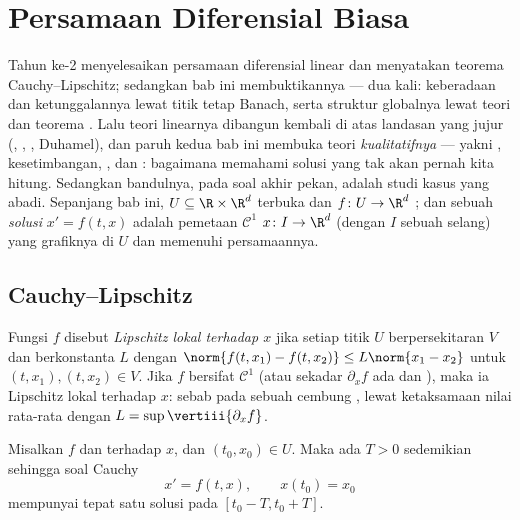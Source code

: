 \chapter{Persamaan Diferensial Biasa}\label{ch:b3:ode}

Tahun ke-2 menyelesaikan persamaan diferensial linear dan menyatakan
teorema Cauchy--Lipschitz; sedangkan bab ini membuktikannya --- dua kali:
keberadaan dan ketunggalannya lewat titik tetap Banach, serta
struktur globalnya lewat teori  dan
teorema . Lalu teori linearnya dibangun
kembali di atas landasan yang jujur (, , , Duhamel), dan paruh kedua bab ini membuka
teori \emph{kualitatifnya} --- yakni , kesetimbangan,
, dan : bagaimana
memahami solusi yang tak akan pernah kita hitung. Sedangkan bandulnya, pada
soal akhir pekan, adalah studi kasus yang abadi. Sepanjang bab ini,
$U \subseteq \R\times\R^d$ terbuka dan $f \colon U \to \R^d$
; dan sebuah \emph{solusi} $x' = f(t, x)$ adalah
pemetaan $\mathcal C^1$ $x \colon I \to \R^d$ (dengan $I$ sebuah selang)
yang grafiknya di $U$ dan memenuhi persamaannya.

\section{Cauchy--Lipschitz}

\begin{definition}\label{def:b3:ode:lipschitz}
Fungsi $f$ disebut \emph{Lipschitz lokal terhadap $x$}
jika setiap titik $U$ berpersekitaran $V$ dan berkonstanta
$L$ dengan $\norm{f(t, x_1) - f(t, x_2)} \leq L\norm{x_1 -
x_2}$ untuk $(t, x_1), (t, x_2) \in V$. Jika $f$ bersifat $\mathcal
C^1$ (atau sekadar $\partial_xf$ ada dan ), maka ia
Lipschitz lokal terhadap $x$: sebab pada sebuah  cembung
, lewat ketaksamaan nilai rata-rata dengan $L =
\sup\vertiii{\partial_xf}$.
\end{definition}

\begin{theorem}
\label{thm:b3:ode:cauchylipschitz}
Misalkan $f$  dan  terhadap $x$, dan $(t_0,
x_0) \in U$. Maka ada $T > 0$ sedemikian sehingga soal Cauchy
\[
x' = f(t, x), \qquad x(t_0) = x_0
\]
mempunyai tepat satu solusi pada $[t_0 - T, t_0 +
T]$.
\end{theorem}

